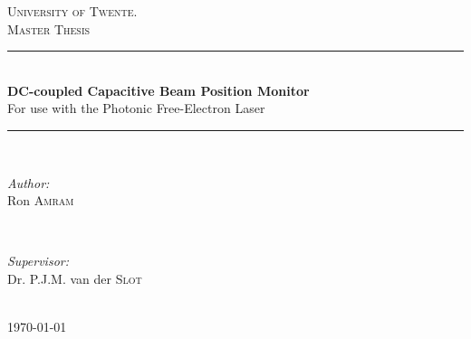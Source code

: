 \documentclass[12pt,a4paper]{report} %
\begin{document}


\begin{titlepage}

\newcommand{\HRule}{\rule{\linewidth}{0.5mm}} %

\center %

\textsc{\LARGE University of Twente.}\\[1.5cm] %
\textsc{\Large Master Thesis}\\[0.5cm] %

\HRule \\[0.4cm]
{ \huge \bfseries DC-coupled Capacitive Beam Position Monitor}\\[0.4cm] %
{\Large For use with the Photonic Free-Electron Laser}
\HRule \\[1.5cm]

\begin{minipage}{0.4\textwidth}
\begin{flushleft} \large
\emph{Author:}\\
Ron \textsc{Amram} %
\end{flushleft}
\end{minipage}
~
\begin{minipage}{0.4\textwidth}
\begin{flushright} \large
\emph{Supervisor:} \\
Dr. P.J.M. van der  \textsc{Slot} %
\end{flushright}
\end{minipage}\\[4cm]

{\large \today}\\[3cm] %


\vfill %

\end{titlepage}
\end{document}
